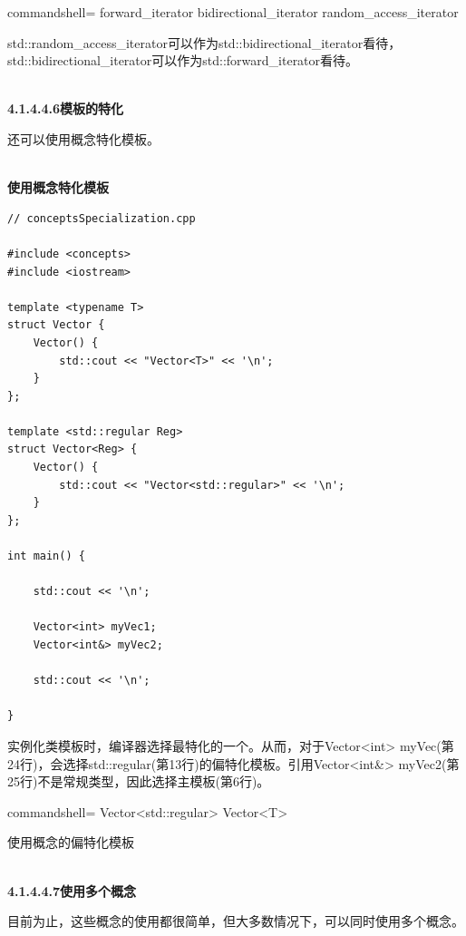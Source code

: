 \begin{tcblisting}{commandshell={}}
forward_iterator
bidirectional_iterator
random_access_iterator
\end{tcblisting}

std::random\_access\_iterator可以作为std::bidirectional\_iterator看待，std::bidirectional\_iterator可以作为std::forward\_iterator看待。

\hspace*{\fill} \\ %
\noindent
\textbf{4.1.4.4.6\hspace{0.2cm}模板的特化}

还可以使用概念特化模板。

\hspace*{\fill} \\ %
\noindent
\textbf{使用概念特化模板}
\begin{lstlisting}[style=styleCXX]
// conceptsSpecialization.cpp

#include <concepts>
#include <iostream>

template <typename T>
struct Vector {
	Vector() {
		std::cout << "Vector<T>" << '\n';
	}
};

template <std::regular Reg>
struct Vector<Reg> {
	Vector() {
		std::cout << "Vector<std::regular>" << '\n';
	}
};

int main() {
	
	std::cout << '\n';
	
	Vector<int> myVec1;
	Vector<int&> myVec2;
	
	std::cout << '\n';

}
\end{lstlisting}

实例化类模板时，编译器选择最特化的一个。从而，对于Vector<int> myVec(第24行)，会选择std::regular(第13行)的偏特化模板。引用Vector<int\&> myVec2(第25行)不是常规类型，因此选择主模板(第6行)。

\begin{tcblisting}{commandshell={}}
Vector<std::regular>
Vector<T>
\end{tcblisting}

\begin{center}
使用概念的偏特化模板
\end{center}

\hspace*{\fill} \\ %
\noindent
\textbf{4.1.4.4.7\hspace{0.2cm}使用多个概念}

目前为止，这些概念的使用都很简单，但大多数情况下，可以同时使用多个概念。

